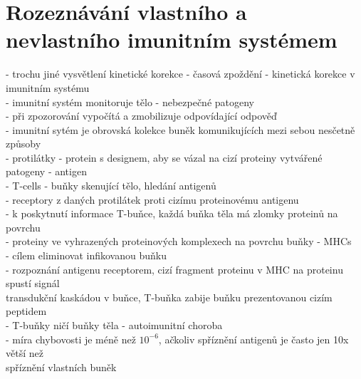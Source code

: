 \documentclass[11pt,a4paper]{report}
\begin{document}
\section{Rozeznávání vlastního a nevlastního imunitním systémem}
- trochu jiné vysvětlení kinetické korekce - časová zpoždění - kinetická korekce v imunitním systému\\
- imunitní systém monitoruje tělo - nebezpečné patogeny\\
\indent - při zpozorování vypočítá a zmobilizuje odpovídající odpověď\\
\indent - imunitní sytém je obrovská kolekce buněk komunikujících mezi sebou nesčetně způsoby\\
\indent - protilátky - protein s designem, aby se vázal na cizí proteiny vytvářené patogeny - antigen\\
\indent - T-cells - buňky skenující tělo, hledání antigenů\\
\indent \indent - receptory z daných protilátek proti cizímu proteinovému antigenu\\
\indent \indent - k poskytnutí informace T-buňce, každá buňka těla má zlomky proteinů na povrchu\\
\indent \indent \indent - proteiny ve vyhrazených proteinových komplexech na povrchu buňky - MHCs\\
\indent \indent - cílem eliminovat infikovanou buňku\\
\indent \indent - rozpoznání antigenu receptorem, cizí fragment proteinu v MHC na proteinu spustí signál\\
\indent \indent \indent transdukční kaskádou v buňce, T-buňka zabije buňku prezentovanou cizím peptidem\\
\indent \indent - T-buňky ničí buňky těla - autoimunitní choroba\\
\indent \indent - míra chybovosti je méně než $10^{-6}$, ačkoliv spříznění antigenů je často jen 10x větší než\\
\indent \indent \indent spříznění vlastních buněk\\
\end{document}
